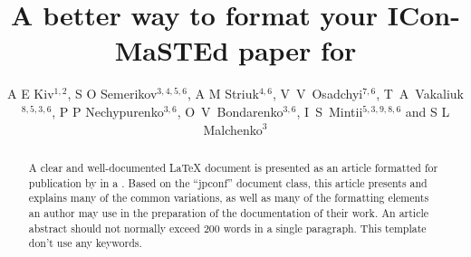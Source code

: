 \documentclass[a4paper]{jpconf}
\begin{document}
%
\title{A better way to format your ICon-MaSTEd paper for \jpcs}
%
%


\author{A E Kiv$^{1,2}$, S O Semerikov$^{3,4,5,6}$, A M Striuk$^{4,6}$, V~V~Osadchyi$^{7,6}$, T~A~Vakaliuk$^{8,5,3,6}$, P P Nechypurenko$^{3,6}$, O~V~Bondarenko$^{3,6}$, I~S~Mintii$^{5,3,9,8,6}$ and S L Malchenko$^{3}$}

\address{$^{1}$ Ben-Gurion University of the Negev, P.O.B. 653, Beer Sheva, 8410501, Israel}
\address{$^{2}$ South Ukrainian National Pedagogical University named after K. D. Ushynsky, 26 Staroportofrankivska Str., Odesa,
	65020, Ukraine}
\address{$^{3}$ Kryvyi Rih State Pedagogical University, 54 Gagarin Ave., Kryvyi Rih, 50086, Ukraine}
\address{$^{4}$ Kryvyi Rih National University, 11 Vitalii Matusevych Str., Kryvyi Rih, 50027, Ukraine}
\address{$^{5}$ Institute for Digitalisation of Education of the NAES of Ukraine, 9 M.~Berlynskoho Str., Kyiv, 04060, Ukraine}
\address{$^{6}$ Academy of Cognitive and Natural Sciences, 54 Gagarin Ave., Kryvyi Rih, 50086, Ukraine}
\address{$^{7}$ Borys Grinchenko Kyiv University, 18/2 Bulvarno-Kudriavska Str., Kyiv, 04053, Ukraine}
\address{$^{8}$ Zhytomyr Polytechnic State University, 103 Chudnivska Str.,	Zhytomyr, 10005, Ukraine}
\address{$^{9}$ Lviv Polytechnic National University, 12 Stepana Bandery Str., Lviv, 79000, Ukraine}




\begin{abstract}
A clear and well-documented \LaTeX{} document is presented as an
  article formatted for publication by \iopp in a \jpcs. Based on the ``jpconf'' document class, this article presents and explains many of the common variations, as well as many of the formatting elements an author may use in the preparation of the documentation of their work. An article abstract should not normally exceed 200 words in a single paragraph. This template don't use any keywords.
\end{abstract}
%
\end{document}
